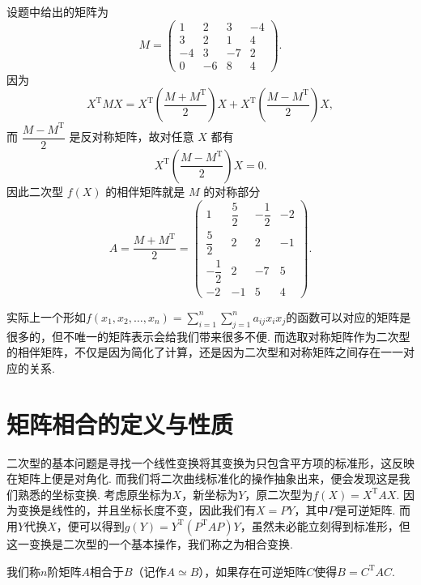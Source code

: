 \begin{solution}
    设题中给出的矩阵为
    \[
        M=\begin{pmatrix}
            1 & 2 & 3 & -4 \\
            3 & 2 & 1 & 4 \\
            -4 & 3 & -7 & 2 \\
            0 & -6 & 8 & 4
        \end{pmatrix}.
    \]
    因为
    \[
        X^\mathrm{T}MX=X^\mathrm{T}\left(\frac{M+M^\mathrm{T}}{2}\right)X+X^\mathrm{T}\left(\frac{M-M^\mathrm{T}}{2}\right)X,
    \]
    而 $ \dfrac{M-M^\mathrm{T}}{2} $ 是反对称矩阵，故对任意 $X$ 都有
    \[
        X^\mathrm{T}\left(\frac{M-M^\mathrm{T}}{2}\right)X=0.
    \]
    因此二次型 $f(X)$ 的相伴矩阵就是 $M$ 的对称部分
    \[
        A=\frac{M+M^\mathrm{T}}{2}
        =\begin{pmatrix}
            1 & \dfrac{5}{2} & -\dfrac{1}{2} & -2 \\
            \dfrac{5}{2} & 2 & 2 & -1 \\
            -\dfrac{1}{2} & 2 & -7 & 5 \\
            -2 & -1 & 5 & 4
        \end{pmatrix}.
    \]
\end{solution}

实际上一个形如$f(x_1,x_2,\ldots,x_n)=\displaystyle\sum_{i=1}^{n}\sum_{j=1}^{n}a_{ij}x_ix_j$的函数可以对应的矩阵是很多的，但不唯一的矩阵表示会给我们带来很多不便. 而选取对称矩阵作为二次型的相伴矩阵，不仅是因为简化了计算，还是因为二次型和对称矩阵之间存在一一对应的关系.

\section{矩阵相合的定义与性质}

二次型的基本问题是寻找一个线性变换将其变换为只包含平方项的标准形，这反映在矩阵上便是对角化. 而我们将二次曲线标准化的操作抽象出来，便会发现这是我们熟悉的坐标变换. 考虑原坐标为$X$，新坐标为$Y$，原二次型为$f(X) = X^\mathrm{T}AX$. 因为变换是线性的，并且坐标长度不变，因此我们有$X=PY$，其中$P$是可逆矩阵. 而用$Y$代换$X$，便可以得到$g(Y) = Y^\mathrm{T}(P^\mathrm{T}AP)Y$，虽然未必能立刻得到标准形，但这一变换是二次型的一个基本操作，我们称之为相合变换.

\begin{definition}{}{}
    我们称$n$阶矩阵$A$相合于$B$（记作$A\simeq B$），如果存在可逆矩阵$C$使得$B=C^\mathrm{T}AC$.
\end{definition}

